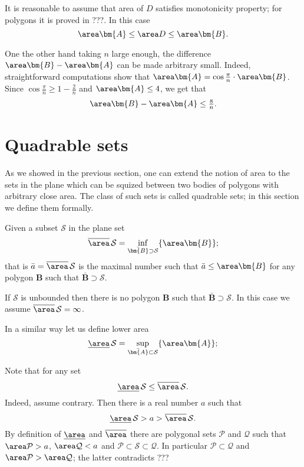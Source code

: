 {It is reasonable to assume that area of $D$ satisfies monotonicity property;
for polygons it is proved in ???.
In this case 
\[\area\bm{A}\le\area D\le \area\bm{B}.\]

One the other hand taking $n$ large enough, 
the difference $\area\bm{B}-\area\bm{A}$ can be made arbitrary small.
Indeed, straightforward computations show that
$\area\bm{A}=\cos\tfrac\pi n\cdot\area\bm{B}$. 
Since $\cos\tfrac\pi n\ge 1-\tfrac2n $ and $\area \bm{A}\le 4$,
we get that
\[\area\bm{B}-\area\bm{A}\le \tfrac8n.\]










\section*{Quadrable sets}

As we showed in the previous section,
one can extend the notion of area to the sets in the plane which can be squized between two bodies of polygons with arbitrary close area.
The class of such sets is called quadrable sets;
in this section we define them formally.

Given a subset  $\mathcal{S}$ in the plane
set
\[\overline\area\,\mathcal{S}=\inf_{\bar{\bm{B}}\supset \mathcal{S}}\{\area\bm{B}\};\]
that is $\bar a=\overline\area\,\mathcal{S}$ is the maximal number such that $\bar a\le \area\bm{B}$ for any polygon $\bm{B}$ such that $\bar{\bm{B}}\supset \mathcal{S}$.

If $\mathcal{S}$ is unbounded
then there is no polygon $\bm{B}$ such that $\bar{\bm{B}}\supset \mathcal{S}$.
In this case we assume $\overline\area\,\mathcal{S}=\infty$.

In a similar way let us define lower area 
\[\underline\area\,\mathcal{S}=\sup_{\bar{\bm{A}}\subset \mathcal{S}}\{\area\bm{A}\};\]

Note that for any set 
\[\underline\area\,\mathcal{S}\le\overline\area\,\mathcal{S}.\]
Indeed, assume contrary. Then there is a real number $a$ such that 
\[\underline\area\,\mathcal{S}>a>\overline\area\,\mathcal{S}.\]
By definition of $\underline\area$ and $\overline\area$ there are 
polygonal sets $\mathcal{P}$ and $\mathcal{Q}$ 
such that $\area\mathcal{P}>a$, $\area \mathcal{Q}<a$
and $\mathcal{P}\subset \mathcal{S}\subset\mathcal{Q}$.
In particular $\mathcal{P}\subset \mathcal{Q}$ 
and $\area\mathcal{P}>\area \mathcal{Q}$;
the latter contradicts ???

}
